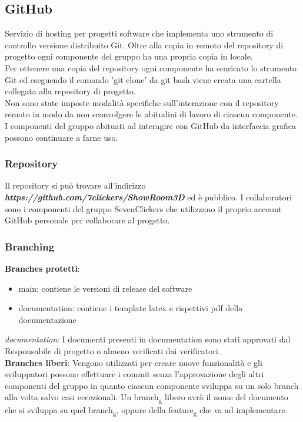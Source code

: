 \subsection{GitHub}
Servizio di hosting per progetti software che implementa uno strumento di controllo versione distribuito Git.
Oltre alla copia in remoto del repository di progetto ogni componente del gruppo ha una propria copia in locale.\\
Per ottenere una copia del repository ogni componente ha scaricato lo strumento Git ed eseguendo il 
comando 'git clone' da git bash viene creata una cartella collegata alla repository di progetto.\\
Non sono state imposte modalità specifiche sull'interazione con il repository remoto in modo da non sconvolgere le abitudini di lavoro di 
ciascun componente.\\
I componenti del gruppo abituati ad interagire con GitHub da interfaccia grafica possono continuare a farne uso.
\subsubsection{Repository}
Il repository si può trovare all'indirizzo \textbf{\textit{https://github.com/7clickers/ShowRoom3D}} ed è pubblico. 
I collaboratori sono i componenti del gruppo SevenClickers che utilizzano il proprio account GitHub personale per collaborare al progetto.
\subsubsection{Branching}
\textbf{Branches protetti}:
    \begin{itemize} 
        \item main: contiene le versioni di release del software
        \item documentation: contiene i template latex e rispettivi pdf della documentazione
    \end{itemize}
\textit{documentation}: 
I documenti presenti in documentation sono stati approvati dal Responsabile di progetto o almeno verificati dai verificatori.\\
\textbf{Branches liberi}: 
Vengono utilizzati per creare nuove funzionalità e gli sviluppatori possono effettuare i commit senza l'approvazione degli altri componenti del gruppo
in quanto ciascun componente sviluppa su un solo branch alla volta salvo casi eccezionali.
Un branch\textsubscript{g} libero avrà il nome del documento che si sviluppa su quel branch\textsubscript{g}, oppure della feature\textsubscript{g} che va ad implementare.
